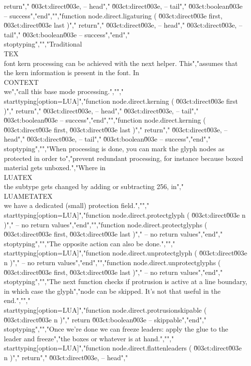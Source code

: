 return","        \u003ct:direct\u003e, -- head","        \u003ct:direct\u003e, -- tail","        \u003ct:boolean\u003e -- success","end","","function node.direct.ligaturing ( \u003ct:direct\u003e first, \u003ct:direct\u003e last )","    return","        \u003ct:direct\u003e, -- head","        \u003ct:direct\u003e, -- tail","        \u003ct:boolean\u003e -- success","end","\\stoptyping","","Traditional \\TEX\\ font kern processing can be achieved with the next helper. This","assumes that the kern information is present in the font. In \\CONTEXT\\ we","call this base mode processing.","","\\starttyping[option=LUA]","function node.direct.kerning ( \u003ct:direct\u003e first )","    return","        \u003ct:direct\u003e, -- head","        \u003ct:direct\u003e, -- tail","        \u003ct:boolean\u003e -- success","end","","function node.direct.kerning ( \u003ct:direct\u003e first, \u003ct:direct\u003e last )","    return","        \u003ct:direct\u003e, -- head","        \u003ct:direct\u003e, -- tail","        \u003ct:boolean\u003e -- success","end","\\stoptyping","","When processing is done, you can mark the glyph nodes as protected in order to","prevent redundant processing, for instance because boxed material gets unboxed.","Where in \\LUATEX\\ the subtype gets changed by adding or subtracting 256, in","\\LUAMETATEX\\ we have a dedicated (small) protection field.","","\\starttyping[option=LUA]","function node.direct.protectglyph ( \u003ct:direct\u003e n )","    -- no return values","end","","function node.direct.protectglyphs ( \u003ct:direct\u003e first, \u003ct:direct\u003e last )","    -- no return values","end","\\stoptyping","","The opposite action can also be done.","","\\starttyping[option=LUA]","function node.direct.unprotectglyph ( \u003ct:direct\u003e n )","    -- no return values","end","","function node.direct.unprotectglyphs ( \u003ct:direct\u003e first, \u003ct:direct\u003e last )","    -- no return values","end","\\stoptyping","","The next function checks if protrusion is active at a line boundary, in which case the glyph","node can be skipped. It's not that useful in the end.","","\\starttyping[option=LUA]","function node.direct.protrusionskipable ( \u003ct:direct\u003e n )","    return \u003ct:boolean\u003e -- skippable","end","\\stoptyping","","Once we're done we can freeze leaders: apply the glue to the leader and freeze","the boxes or whatever is at hand.","","\\starttyping[option=LUA]","function node.direct.flattenleaders ( \u003ct:direct\u003e n )","    return","        \u003ct:direct\u003e, -- head","       